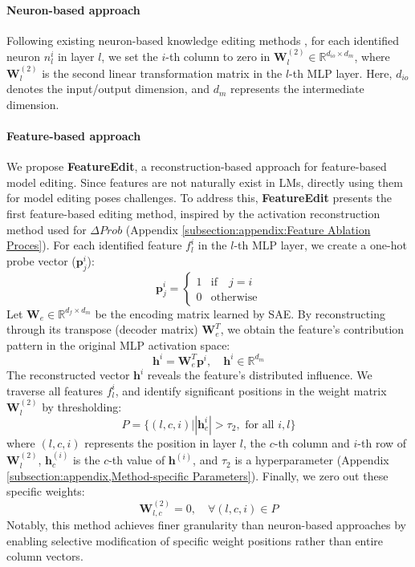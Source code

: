 \paragraph{Neuron-based approach} Following existing neuron-based knowledge editing methods \citep{dai2022knowledge,chen2024knowledgelocalizationmissionaccomplished}, for each identified neuron $n^i_l$ in layer $l$, we set the $i$-th column to zero in $\mathbf{W}^{(2)}_l \in \mathbb{R}^{d_{io} \times d_m}$, where $\mathbf{W}^{(2)}_l$ is the second linear transformation matrix in the $l$-th MLP layer. Here, $d_{io}$ denotes the input/output dimension, and $d_m$ represents the intermediate dimension.


\paragraph{Feature-based approach}
We propose \textbf{FeatureEdit}, a reconstruction-based approach for feature-based model editing. Since features are not naturally exist in LMs, directly using them for model editing poses challenges.  To address this, \textbf{FeatureEdit} presents the first feature-based editing method, inspired by the activation reconstruction method used for $\Delta Prob$ (Appendix \ref{subsection:appendix:Feature Ablation Proces}).
For each identified feature $f^i_l$ in the $l$-th MLP layer, we create a one-hot probe vector ($\mathbf{p}^{i}_j$):
\begin{equation}
   \mathbf{p}^{i}_j = \begin{cases} 
   1 & \text{if} \quad j = i \\
   0 & \text{otherwise}
   \end{cases}
\end{equation}
Let $\mathbf{W}_e \in \mathbb{R}^{d_f \times d_m}$ be the encoding matrix learned by SAE. By reconstructing through its transpose (decoder matrix) $\mathbf{W}_e^T$, we obtain the feature's contribution pattern in the original MLP activation space:
\begin{equation}
   \mathbf{h}^{i} = \mathbf{W}_e^T\mathbf{p}^{i},\quad \mathbf{h}^{i} \in \mathbb{R}^{d_m}
\end{equation}
The reconstructed vector $\mathbf{h}^{i}$ reveals the feature's distributed influence. We traverse all features $f^i_l$, and identify significant positions in the weight matrix $\mathbf{W}^{(2)}_l$ by thresholding:
\begin{equation}
P = \{(l, c, i) \Big| |\mathbf{h}^{i}_c| > \tau_2, \text{ for all } i,l\}
\end{equation}
where $(l, c, i)$ represents the position in layer $l$, the $c$-th column and $i$-th row of $\mathbf{W}^{(2)}_l$, $\mathbf{h}^{(i)}_c$ is the $c$-th value of $\mathbf{h}^{(i)}$, and $\tau_2$ is a hyperparameter (Appendix \ref{subsection:appendix,Method-specific Parameters}). Finally, we zero out these specific weights: 
\begin{equation}
   \mathbf{W}^{(2)}_{l,c} = 0, \quad \forall (l,c,i) \in P
\end{equation}
Notably, this method achieves finer granularity than neuron-based approaches by enabling selective modification of specific weight positions rather than entire column vectors.


